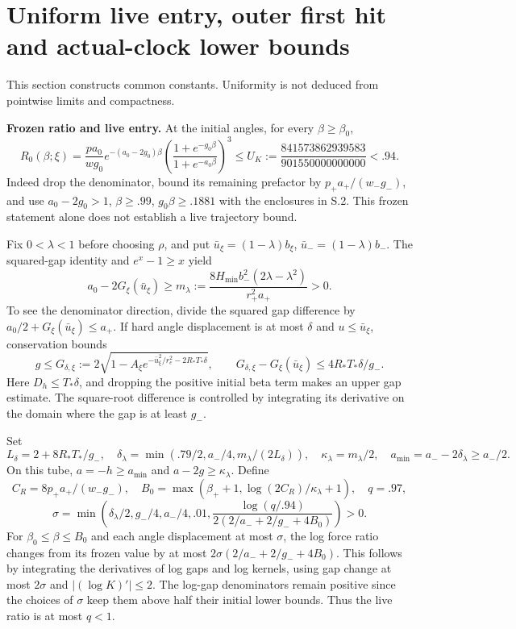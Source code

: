 \documentclass[11pt,a4paper]{article}
\begin{document}
\section{Uniform live entry, outer first hit and actual-clock lower bounds}

This section constructs common constants. Uniformity is not deduced from pointwise limits and compactness.

\textbf{Frozen ratio and live entry.} At the initial angles, for every $\beta\ge\beta_0$,
\[
 R_0(\beta;\xi)=\frac{pa_0}{wg_0}e^{-(a_0-2g_0)\beta}
       \left(\frac{1+e^{-g_0\beta}}{1+e^{-a_0\beta}}\right)^3
 \le U_K:=\frac{841573862939583}{901550000000000}<.94 .
\]
Indeed drop the denominator, bound its remaining prefactor by $p_+a_+/(w_-g_-)$, and use $a_0-2g_0>1$, $\beta\ge.99$, $g_0\beta\ge.1881$ with the enclosures in S.2. This frozen statement alone does not establish a live trajectory bound.

Fix $0<\lambda<1$ before choosing $\rho$, and put $\bar u_\xi=(1-\lambda)b_\xi$, $\bar u_-=(1-\lambda)b_-$. The squared-gap identity and $e^x-1\ge x$ yield
\[
 a_0-2G_\xi(\bar u_\xi)\ge
 m_\lambda:=\frac{8H_{\min}b_-^2(2\lambda-\lambda^2)}{r_+^2a_+}>0 .
\]
To see the denominator direction, divide the squared gap difference by $a_0/2+G_\xi(\bar u_\xi)\le a_+$. If hard angle displacement is at most $\delta$ and $u\le\bar u_\xi$, conservation bounds
\[
 g\le G_{\delta,\xi}:=
 2\sqrt{1-A_\xi e^{-\bar u_\xi^2/r_e^2-2R_*T_*\delta}},
 \qquad G_{\delta,\xi}-G_\xi(\bar u_\xi)\le4R_*T_*\delta/g_- .
\]
Here $D_h\le T_*\delta$, and dropping the positive initial beta term makes an upper gap estimate. The square-root difference is controlled by integrating its derivative on the domain where the gap is at least $g_-$.

Set
\[
 L_\delta=2+8R_*T_*/g_-,\quad
 \delta_\lambda=\min(.79/2,a_-/4,m_\lambda/(2L_\delta)),\quad
 \kappa_\lambda=m_\lambda/2,\quad a_{\min}=a_--2\delta_\lambda\ge a_-/2 .
\]
On this tube, $a=-h\ge a_{\min}$ and $a-2g\ge\kappa_\lambda$. Define
\[
 C_R=8p_+a_+/(w_-g_-),\quad
 B_0=\max(\beta_++1,\log(2C_R)/\kappa_\lambda+1),\quad q=.97,
\]
\[
 \sigma=\min\left(\delta_\lambda/2,g_-/4,a_-/4,.01,
 \frac{\log(q/.94)}{2(2/a_-+2/g_-+4B_0)}\right)>0 .
\]
For $\beta_0\le\beta\le B_0$ and each angle displacement at most $\sigma$, the log force ratio changes from its frozen value by at most $2\sigma(2/a_-+2/g_-+4B_0)$. This follows by integrating the derivatives of log gaps and log kernels, using gap change at most $2\sigma$ and $|(\log K)'|\le2$. The log-gap denominators remain positive since the choices of $\sigma$ keep them above half their initial lower bounds. Thus the live ratio is at most $q<1$.
\end{document}
